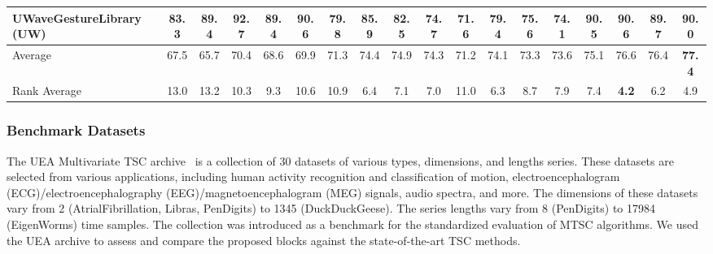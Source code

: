 \documentclass[journal]{IEEEtran}
\begin{document}
\begin{table*}[!t]
\begin{tabular}{l|c|c|c|c|c|cccc|cccc|cccc|}
UWaveGestureLibrary (UW) & 83.3  & 89.4  & \textbf{92.7} & 89.4  & 90.6  & \textcolor[rgb]{ 1,  0,  0}{79.8} & \textcolor[rgb]{ .188,  .329,  .588}{85.9} & \textcolor[rgb]{ .188,  .329,  .588}{82.5} & 74.7  & \textcolor[rgb]{ 1,  0,  0}{71.6} & \textcolor[rgb]{ .776,  .349,  .067}{79.4} & \textcolor[rgb]{ .776,  .349,  .067}{75.6} & \textcolor[rgb]{ .776,  .349,  .067}{74.1} & \textcolor[rgb]{ 1,  0,  0}{90.5} & \textcolor[rgb]{ .439,  .678,  .278}{90.6} & 89.7  & 90.0 \\
\midrule
Average & 67.5  & 65.7  & 70.4  & 68.6  & 69.9  & \textcolor[rgb]{ 1,  0,  0}{71.3} & \textcolor[rgb]{ .188,  .329,  .588}{74.4} & \textcolor[rgb]{ .188,  .329,  .588}{74.9} & \textcolor[rgb]{ .188,  .329,  .588}{74.3} & \textcolor[rgb]{ 1,  0,  0}{71.2} & \textcolor[rgb]{ .776,  .349,  .067}{74.1} & \textcolor[rgb]{ .776,  .349,  .067}{73.3} & \textcolor[rgb]{ .776,  .349,  .067}{73.6} & \textcolor[rgb]{ 1,  0,  0}{75.1} & \textcolor[rgb]{ .439,  .678,  .278}{76.6} & \textcolor[rgb]{ .439,  .678,  .278}{76.4} & \textcolor[rgb]{ .439,  .678,  .278}{\textbf{77.4}} \\
\midrule
Rank Average & 13.0  & 13.2  & 10.3  & 9.3   & 10.6  & \textcolor[rgb]{ 1,  0,  0}{10.9} & \textcolor[rgb]{ .188,  .329,  .588}{6.4} & 7.1   & 7.0   & \textcolor[rgb]{ 1,  0,  0}{11.0} & \textcolor[rgb]{ .776,  .349,  .067}{6.3} & 8.7   & 7.9   & \textcolor[rgb]{ 1,  0,  0}{7.4} & \textcolor[rgb]{ .573,  .816,  .314}{\textbf{4.2}} & 6.2   & 4.9 \\
\bottomrule
\end{tabular}

  \label{tb:all}\end{table*}\subsubsection{Benchmark Datasets}
The UEA Multivariate TSC archive~\cite{bagnall2018uea} is a collection of 30 datasets of various types, dimensions, and lengths series. These datasets are selected from various applications, including human activity recognition and classification of motion, electroencephalogram (ECG)/electroencephalography (EEG)/magnetoencephalogram (MEG) signals, audio spectra, and more. The dimensions of these datasets vary from 2 (AtrialFibrillation, Libras, PenDigits) to 1345 (DuckDuckGeese). The series lengths vary from 8 (PenDigits) to 17984 (EigenWorms) time samples. The collection was introduced as a benchmark for the standardized evaluation of MTSC algorithms. We used the UEA archive to assess and compare the proposed blocks against the state-of-the-art TSC methods. 
\end{document}
